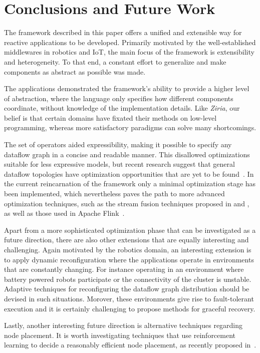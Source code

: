 \documentclass[sigplan,screen,10pt]{acmart}
\begin{document}
\section{Conclusions and Future Work} \label{sec:conclusions}

The framework described in this paper offers a unified and extensible way for
reactive applications to be developed. Primarily motivated by the well-established
middlewares in robotics and IoT, the main focus of the framework is extensibility
and heterogeneity. To that end, a constant effort to generalize and make components
as abstract as possible was made.

The applications demonstrated the framework's ability to provide a higher level
of abstraction, where the language only specifies how different components
coordinate, without knowledge of the implementation details. 
Like \textit{Ziria}, our belief is that certain domains have
fixated their methods on low-level programming, whereas more satisfactory
paradigms can solve many shortcomings.

The set of operators aided expressibility, making it possible to specify any
dataflow graph in a concise and readable manner. This disallowed optimizations
suitable for less expressive models, but recent research suggest that general
dataflow topologies have optimization opportunities that are yet to be
found~\cite{blackbox}. In the current reincarnation of the framework only
a minimal optimization stage has been implemented, which nevertheless paves
the path to more advanced optimization techniques, such as the stream
fusion techniques proposed in \cite{streamfusion} and \cite{haskellfusion},
as well as those used in Apache Flink~\cite{blackbox}.

Apart from a more sophisticated optimization phase that can be investigated
as a future direction, there are also other extensions that are equally interesting
and challenging. Again motivated by the robotics domain, an interesting extension
is to apply dynamic reconfiguration where the applications operate in
environments that are constantly changing. For instance operating in an environment
where battery powered robots participate or the connectivity of the cluster is unstable.
Adaptive techniques for reconfiguring the dataflow graph distribution should be
devised in such situations. Morover, these environments give rise to fault-tolerant
execution and it is certainly challenging to propose methods for graceful recovery.

Lastly, another interesting future direction is alternative techniques regarding
node placement. It is worth investigating techniques that use reinforcement learning
to decide a reasonably efficient node placement, as recently proposed in~\cite{reinforcement}.
\end{document}
